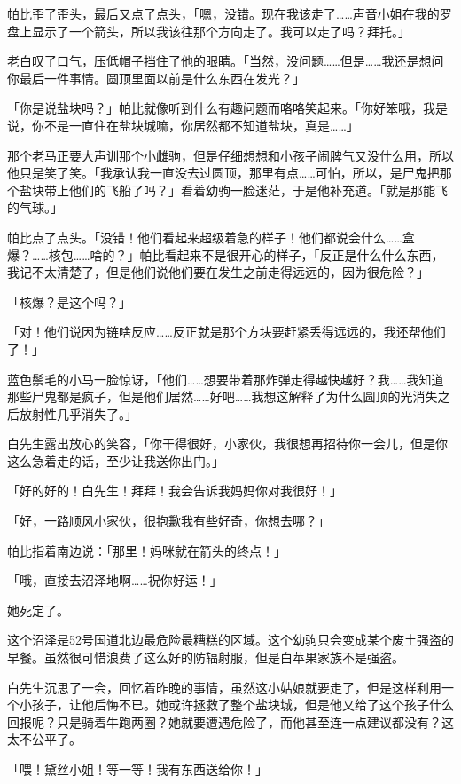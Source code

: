 帕比歪了歪头，最后又点了点头，「嗯，没错。现在我该走了……声音小姐在我的罗盘上显示了一个箭头，所以我该往那个方向走了。我可以走了吗？拜托。」

老白叹了口气，压低帽子挡住了他的眼睛。「当然，没问题……但是……我还是想问你最后一件事情。圆顶里面以前是什么东西在发光？」

「你是说盐块吗？」帕比就像听到什么有趣问题而咯咯笑起来。「你好笨哦，我是说，你不是一直住在盐块城嘛，你居然都不知道盐块，真是……」

那个老马正要大声训那个小雌驹，但是仔细想想和小孩子闹脾气又没什么用，所以他只是笑了笑。「我承认我一直没去过圆顶，那里有点……可怕，所以，是尸鬼把那个盐块带上他们的飞船了吗？」看着幼驹一脸迷茫，于是他补充道。「就是那能飞的气球。」

帕比点了点头。「没错！他们看起来超级着急的样子！他们都说会什么……盒爆？……核包……啥的？」帕比看起来不是很开心的样子，「反正是什么什么东西，我记不太清楚了，但是他们说他们要在发生之前走得远远的，因为很危险？」

「核爆？是这个吗？」

「对！他们说因为链啥反应……反正就是那个方块要赶紧丢得远远的，我还帮他们了！」

蓝色鬃毛的小马一脸惊讶，「他们……想要带着那炸弹走得越快越好？我……我知道那些尸鬼都是疯子，但是他们居然……好吧……我想这解释了为什么圆顶的光消失之后放射性几乎消失了。」

白先生露出放心的笑容，「你干得很好，小家伙，我很想再招待你一会儿，但是你这么急着走的话，至少让我送你出门。」

「好的好的！白先生！拜拜！我会告诉我妈妈你对我很好！」

「好，一路顺风小家伙，很抱歉我有些好奇，你想去哪？」

帕比指着南边说：「那里！妈咪就在箭头的终点！」

「哦，直接去沼泽地啊……祝你好运！」

她死定了。

这个沼泽是52号国道北边最危险最糟糕的区域。这个幼驹只会变成某个废土强盗的早餐。虽然很可惜浪费了这么好的防辐射服，但是白苹果家族不是强盗。

白先生沉思了一会，回忆着昨晚的事情，虽然这小姑娘就要走了，但是这样利用一个小孩子，让他后悔不已。她或许拯救了整个盐块城，但是他又给了这个孩子什么回报呢？只是骑着牛跑两圈？她就要遭遇危险了，而他甚至连一点建议都没有？这太不公平了。

「喂！黛丝小姐！等一等！我有东西送给你！」

\horizonline


